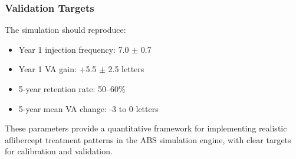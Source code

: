 \subsubsection{Validation Targets}
The simulation should reproduce:
\begin{itemize}
    \item Year 1 injection frequency: 7.0 $\pm$ 0.7
    \item Year 1 VA gain: +5.5 $\pm$ 2.5 letters
    \item 5-year retention rate: 50--60\%
    \item 5-year mean VA change: -3 to 0 letters
\end{itemize}

These parameters provide a quantitative framework for implementing realistic aflibercept treatment patterns in the ABS simulation engine, with clear targets for calibration and validation.
